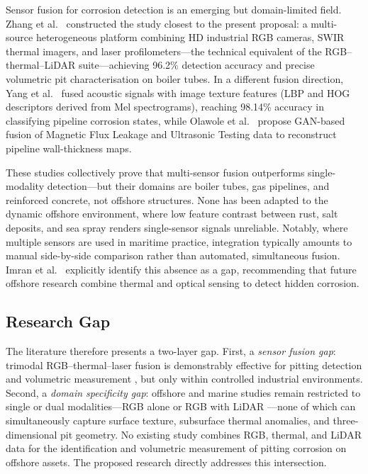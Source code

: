 Sensor fusion for corrosion detection is an emerging but domain-limited field. Zhang et al.\ \cite{zhang2026application} constructed the study closest to the present proposal: a multi-source heterogeneous platform combining HD industrial RGB cameras, SWIR thermal imagers, and laser profilometers—the technical equivalent of the RGB--thermal--LiDAR suite—achieving 96.2\% detection accuracy and precise volumetric pit characterisation on boiler tubes. In a different fusion direction, Yang et al.\ \cite{yang2026pipeline} fused acoustic signals with image texture features (LBP and HOG descriptors derived from Mel spectrograms), reaching 98.14\% accuracy in classifying pipeline corrosion states, while Olawole et al.\ \cite{olawole2026advanced} propose GAN-based fusion of Magnetic Flux Leakage and Ultrasonic Testing data to reconstruct pipeline wall-thickness maps.

These studies collectively prove that multi-sensor fusion outperforms single-modality detection—but their domains are boiler tubes, gas pipelines, and reinforced concrete, not offshore structures. None has been adapted to the dynamic offshore environment, where low feature contrast between rust, salt deposits, and sea spray renders single-sensor signals unreliable. Notably, where multiple sensors are used in maritime practice, integration typically amounts to manual side-by-side comparison rather than automated, simultaneous fusion. Imran et al.\ \cite{imran2025ship} explicitly identify this absence as a gap, recommending that future offshore research combine thermal and optical sensing to detect hidden corrosion.

\subsection{Research Gap}

The literature therefore presents a two-layer gap. First, a \textit{sensor fusion gap}: trimodal RGB--thermal--laser fusion is demonstrably effective for pitting detection and volumetric measurement \cite{zhang2026application}, but only within controlled industrial environments. Second, a \textit{domain specificity gap}: offshore and marine studies remain restricted to single or dual modalities—RGB alone \cite{soares2023autonomous, imran2025ship} or RGB with LiDAR \cite{yu2022surface}—none of which can simultaneously capture surface texture, subsurface thermal anomalies, and three-dimensional pit geometry. No existing study combines RGB, thermal, and LiDAR data for the identification and volumetric measurement of pitting corrosion on offshore assets. The proposed research directly addresses this intersection.




